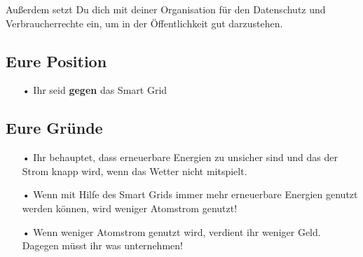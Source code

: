 \documentclass[11pt,a4paper,DIV=10,parskip=half,BCOR=0mm]{scrartcl}
\begin{document}
Außerdem setzt Du dich mit deiner Organisation für den Datenschutz und
Verbraucherrechte ein, um in der Öffentlichkeit gut darzustehen.
\subsection*{Eure Position}
\begin{enumerate}
	\item[•]Ihr seid \textbf{gegen} das Smart Grid
\end{enumerate}
\subsection*{Eure Gründe}
\begin{enumerate}
	\item[•]Ihr behauptet, dass erneuerbare Energien zu unsicher sind und das der Strom knapp wird, wenn das Wetter nicht mitspielt.
	\item[•]Wenn mit Hilfe des Smart Grids immer mehr erneuerbare Energien
genutzt werden können, wird weniger Atomstrom genutzt!
	\item[•] Wenn weniger Atomstrom genutzt wird, verdient ihr weniger Geld.
Dagegen müsst ihr was unternehmen!
\end{enumerate}
\end{document}
